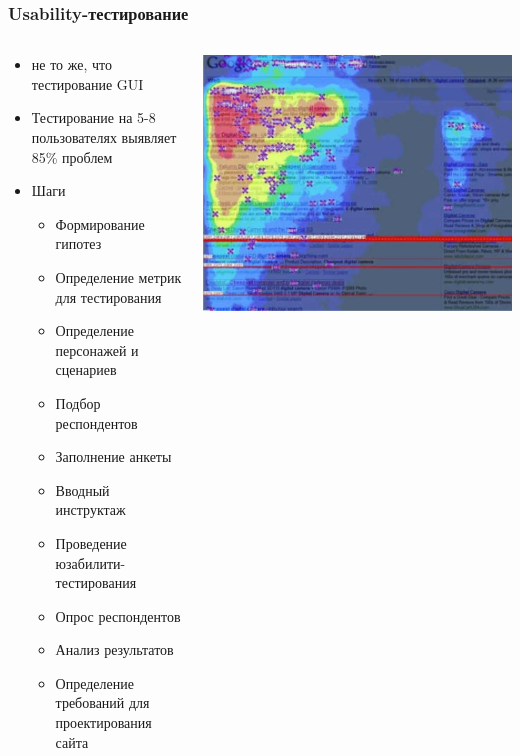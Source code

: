 \documentclass{../../slides-style}
\begin{document}
    \begin{frame}
        \frametitle{Usability-тестирование}
        \begin{columns}
            \begin{column}{0.6\textwidth}
                \begin{itemize}
                    \item не то же, что тестирование GUI
                    \item Тестирование на 5-8 пользователях выявляет 85\% проблем
                    \item Шаги
                    \begin{itemize}
                        \item Формирование гипотез
                        \item Определение метрик для тестирования
                        \item Определение персонажей и сценариев
                        \item Подбор респондентов
                        \item Заполнение анкеты
                        \item Вводный инструктаж
                        \item Проведение юзабилити-тестирования
                        \item Опрос респондентов
                        \item Анализ результатов
                        \item Определение требований для проектирования сайта
                    \end{itemize}
                \end{itemize}
            \end{column}
            \begin{column}{0.4\textwidth}
                \begin{center}
                    \includegraphics[width=\textwidth]{heatMap.png}
                \end{center}
            \end{column}
        \end{columns}
    \end{frame}
\end{document}
